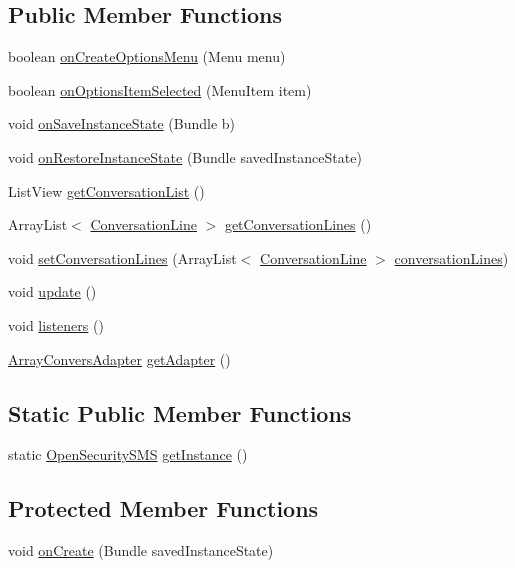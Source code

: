 \subsection*{Public Member Functions}
\begin{DoxyCompactItemize}
\item 
boolean \hyperlink{a00011_a8f7d87763ddaf085205a54e8477ecfce}{on\+Create\+Options\+Menu} (Menu menu)
\item 
boolean \hyperlink{a00011_a37a55c533c74b60c0290ef1329d74e65}{on\+Options\+Item\+Selected} (Menu\+Item item)
\item 
void \hyperlink{a00011_aa2cebeeaec1e0ca5b7bdec2ccfd24252}{on\+Save\+Instance\+State} (Bundle b)
\item 
void \hyperlink{a00011_a3fd108ef7b3bf7c29e53e6c4984d5f84}{on\+Restore\+Instance\+State} (Bundle saved\+Instance\+State)
\item 
List\+View \hyperlink{a00011_a75e7cb8078fb5fdb58b09524fdd9e1d7}{get\+Conversation\+List} ()
\item 
Array\+List$<$ \hyperlink{a00008}{Conversation\+Line} $>$ \hyperlink{a00011_a65bc274b44a44cb00ba767e86e50ee83}{get\+Conversation\+Lines} ()
\item 
void \hyperlink{a00011_a75b300477b934b09cac51aaa4c96b245}{set\+Conversation\+Lines} (Array\+List$<$ \hyperlink{a00008}{Conversation\+Line} $>$ \hyperlink{a00011_aa533b62d6a728d5400683c4d6c0d8334}{conversation\+Lines})
\item 
void \hyperlink{a00011_ac5c54df7ed3b930268c8d7752c101725}{update} ()
\item 
void \hyperlink{a00011_a92b8e0730130e1184a8cdbd89590779d}{listeners} ()
\item 
\hyperlink{a00003}{Array\+Convers\+Adapter} \hyperlink{a00011_ab5e43d47bbe04b3b6a4561d91bc16f9f}{get\+Adapter} ()
\end{DoxyCompactItemize}
\subsection*{Static Public Member Functions}
\begin{DoxyCompactItemize}
\item 
static \hyperlink{a00011}{Open\+Security\+S\+M\+S} \hyperlink{a00011_a20b99dca6a5147ea92b68f8ce333dc2e}{get\+Instance} ()
\end{DoxyCompactItemize}
\subsection*{Protected Member Functions}
\begin{DoxyCompactItemize}
\item 
void \hyperlink{a00011_a85e87cb5ced88dff7c8173ecc4f636d1}{on\+Create} (Bundle saved\+Instance\+State)
\end{DoxyCompactItemize}
